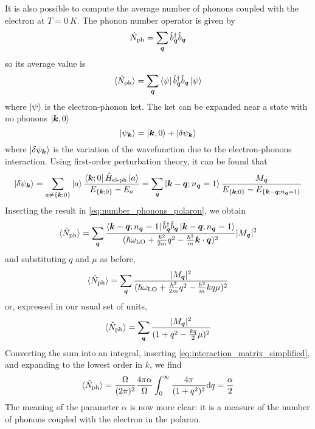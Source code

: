 It is also possible to compute the average number of phonons coupled with the electron at $T = \SI{0}{K}$. The phonon number operator is given by
\begin{equation}
    \hat{N}_\text{ph} = \sum_{\mathbf{\boldsymbol{q}}} \hat{b}^\dagger_{\mathbf{\boldsymbol{q}}} \hat{b}_{\mathbf{\boldsymbol{q}}}
\end{equation}
so its average value is
\begin{equation} \label{eq:number_phonons_polaron}
    \langle \hat{N}_\text{ph} \rangle = \sum_{\mathbf{\boldsymbol{q}}} \bra{\psi} \hat{b}^\dagger_{\mathbf{\boldsymbol{q}}} \hat{b}_{\mathbf{\boldsymbol{q}}} \ket{\psi}
\end{equation}
where $\ket{\psi}$ is the electron-phonon ket. The ket can be expanded near a state with no phonons $\ket{\mathbf{\boldsymbol{k}}, 0}$
\begin{equation}
    \ket{\psi_{\mathbf{\boldsymbol{k}}}} = \ket{\mathbf{\boldsymbol{k}}, 0} + \ket{\delta\psi_{\mathbf{\boldsymbol{k}}}}
\end{equation}
where $\ket{\delta\psi_{\mathbf{\boldsymbol{k}}}}$ is the variation of the wavefunction due to the electron-phonons interaction. Using first-order perturbation theory, it can be found that
\begin{equation} \label{eq:sum_integral}
    \ket{\delta\psi_{\mathbf{\boldsymbol{k}}}} = \sum_{a \neq \{\mathbf{\boldsymbol{k}};0\}} \ket{a} \frac{\bra{\mathbf{\boldsymbol{k}};0} \hat{H}_\text{el-ph} \ket{a}}{E_{\{\mathbf{\boldsymbol{k}};0\}} - E_a}
    = \sum_{\mathbf{\boldsymbol{q}}} \ket{\mathbf{\boldsymbol{k}}-\mathbf{\boldsymbol{q}};n_{\mathbf{\boldsymbol{q}}}=1} \frac{M_{\mathbf{\boldsymbol{q}}}}{E_{\{\mathbf{\boldsymbol{k}};0\}} - E_{\{\mathbf{\boldsymbol{k}}-\mathbf{\boldsymbol{q}};n_{\mathbf{\boldsymbol{q}}}=1\}}}
\end{equation}
Inserting the result in \cref{eq:number_phonons_polaron}, we obtain
\begin{equation}
    \langle \hat{N}_\text{ph} \rangle = \sum_{\mathbf{\boldsymbol{q}}} \frac{\bra{\mathbf{\boldsymbol{k}}-\mathbf{\boldsymbol{q}};n_{\mathbf{\boldsymbol{q}}}=1} \hat{b}^\dagger_{\mathbf{\boldsymbol{q}}} \hat{b}_{\mathbf{\boldsymbol{q}}} \ket{\mathbf{\boldsymbol{k}}-\mathbf{\boldsymbol{q}};n_{\mathbf{\boldsymbol{q}}}=1}}{(\hslash\omega_\text{LO} + \frac{\hslash^2}{2m}q^2 - \frac{\hslash^2}{m}\mathbf{\boldsymbol{k}}\cdot\mathbf{\boldsymbol{q}})^2} |M_{\mathbf{\boldsymbol{q}}}|^2
\end{equation}
and substituting $q$ and $\mu$ as before,
\begin{equation}
    \langle \hat{N}_\text{ph} \rangle = \sum_{\mathbf{\boldsymbol{q}}} \frac{|M_{\mathbf{\boldsymbol{q}}}|^2}{(\hslash\omega_\text{LO} + \frac{\hslash^2}{2m}q^2 - \frac{\hslash^2}{m} kq\mu)^2}
\end{equation}
or, expressed in our usual set of units,
\begin{equation}
    \langle \hat{N}_\text{ph} \rangle = \sum_{\mathbf{\boldsymbol{q}}} \frac{|M_{\mathbf{\boldsymbol{q}}}|^2}{(1 + q^2 - \frac{kq}{2}\mu)^2}
\end{equation}
Converting the sum into an integral, inserting \cref{eq:interaction_matrix_simplified}, and expanding to the lowest order in $k$, we find
\begin{equation}
    \langle \oper{N}_\text{ph} \rangle = \frac{\Omega}{(2\pi)^2} \frac{4\pi\alpha}{\Omega} \int_0^\infty \frac{4\pi}{(1+q^2)^2} \differential q = \frac{\alpha}{2}
\end{equation}
The meaning of the parameter $\alpha$ is now more clear: it is a measure of the number of phonons coupled with the electron in the polaron.

